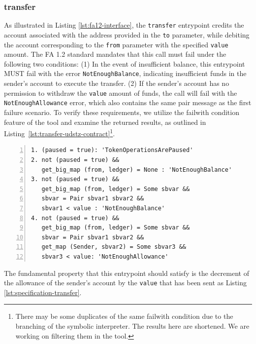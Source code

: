 \documentclass[a4paper,USenglish,cleveref, autoref, thm-restate]{lipics-v2021}
\begin{document}
\subsubsection{transfer}
As illustrated in Listing \ref{lst:fa12-interface}, the
\lstinline/transfer/ entrypoint credits the account associated with
the address provided in the \lstinline/to/ parameter, while debiting
the account corresponding to the \lstinline/from/ parameter with the
specified \lstinline/value/ amount. The FA 1.2 standard mandates that
this call must fail under the following two conditions: (1) In the
event of insufficient balance, this entrypoint MUST fail with the
error \lstinline/NotEnoughBalance/, indicating insufficient funds in
the sender's account to execute the transfer. (2) If the sender's
account has no permission to withdraw the \lstinline/value/ amount of
funds, the call will fail with the \lstinline/NotEnoughAllowance/
error, which also contains the same pair message as the first failure
scenario. To verify these requirements, we utilize the failwith
condition feature of the tool and examine the returned results, as
outlined in Listing~\ref{lst:transfer-udstz-contract}\footnote{There may be some duplicates of the same failwith condition due to the branching of the symbolic interpreter. The results here are shortened. We are working on filtering them in the tool.}.
\begin{lstlisting}[float,captionpos=b,caption={Fail conditions for the \lstinline/transfer/ entrypoint},label={lst:transfer-udstz-contract},numbers=left]
1. (paused = true): 'TokenOperationsArePaused'
2. not (paused = true) &&
   get_big_map (from, ledger) = None : 'NotEnoughBalance'
3. not (paused = true) &&
   get_big_map (from, ledger) = Some sbvar &&
   sbvar = Pair sbvar1 sbvar2 &&
   sbvar1 < value : 'NotEnoughBalance'
4. not (paused = true) &&
   get_big_map (from, ledger) = Some sbvar &&
   sbvar = Pair sbvar1 sbvar2 &&
   get_map (Sender, sbvar2) = Some sbvar3 &&
   sbvar3 < value: 'NotEnoughAllowance'
\end{lstlisting}
The fundamental property that this entrypoint should satisfy is the decrement of the allowance of the sender's account by the \lstinline/value/ that has been sent as Listing \ref{lst:specification-transfer}.
\end{document}
